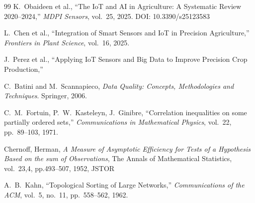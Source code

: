 \documentclass[12pt]{article}
\begin{document}
\begin{thebibliography}{99}
 K.~Obaideen et al., ``The IoT and AI in Agriculture: A Systematic Review 2020--2024,'' \textit{MDPI Sensors}, vol.~25, 2025. 	DOI: 10.3390/s25123583

	L.~Chen et al.,	``Integration of Smart Sensors and IoT in Precision Agriculture,''	\textit{Frontiers in Plant Science}, vol.~16, 2025.

 J.~Perez et al., ``Applying IoT Sensors and Big Data to Improve Precision Crop Production,''

C.~Batini and M.~Scannapieco, \textit{Data Quality: Concepts, Methodologies and Techniques}. Springer, 2006.
	
 C.~M.~Fortuin, P.~W.~Kasteleyn, J.~Ginibre, ``Correlation inequalities on some partially ordered sets,'' \textit{Communications in Mathematical Physics}, vol.~22,
pp.~89--103, 1971.

 Chernoff, Herman, \textit{A Measure of Asymptotic Efficiency for Tests of a Hypothesis Based on the sum of Observations},	{The Annals of Mathematical Statistics},
	vol.~23,4, pp.{493--507}, 1952, JSTOR
	
 A.~B.~Kahn, ``Topological Sorting of Large Networks,'' \textit{Communications of the ACM}, vol.~5, no.~11, pp.~558--562, 1962.


\end{thebibliography}
\end{document}
